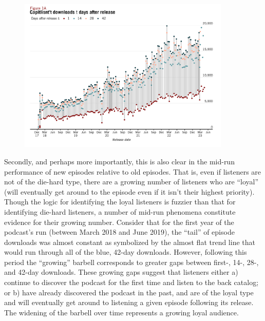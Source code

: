 \documentclass[11pt, letterpaper, twoside]{article}
\begin{document}
\begin{figure}[!htbp]
  \centering
  \includegraphics[width=0.9\textwidth]{figures/all_1142842_day_cumul_perf.png}
  \caption{}
  \label{fig:all_1142842_cumul_perf}
\end{figure}

Secondly, and perhaps more importantly, this is also clear in the mid-run performance of new episodes relative to old episodes. That is, even if listeners are not of the die-hard type, there are a growing number of listeners who are ``loyal'' (will eventually get around to the episode even if it isn't their highest priority). Though the logic for identifying the loyal listeners is fuzzier than that for identifying die-hard listeners, a number of mid-run phenomena constitute evidence for their growing number. Consider that for the first year of the podcast's run (between March 2018 and June 2019), the ``tail'' of episode downloads was almost constant as symbolized by the almost flat trend line that would run through all of the blue, 42-day downloads. However, following this period the ``growing'' barbell corresponds to greater gaps between first-, 14-, 28-, and 42-day downloads. These growing gaps suggest that listeners either a) continue to discover the podcast for the first time and listen to the back catalog; or b) have already discovered the podcast in the past, and are of the loyal type and will eventually get around to listening a given episode following its release. The widening of the barbell over time represents a growing loyal audience.\\
\end{document}
